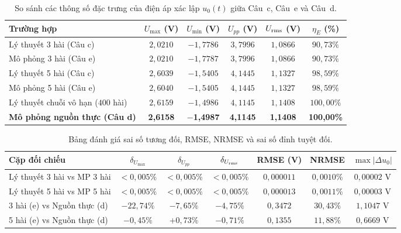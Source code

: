 \begin{table}[!htbp]
    \centering
    \caption{So sánh các thông số đặc trưng của điện áp xác lập $u_0(t)$ giữa Câu~c, Câu~e và Câu~d.}
    \label{tab:comparison_main}
    \vspace{4pt}
    \small
    \begin{tabular}{|l|c|c|c|c|c|}
        \toprule
        \textbf{Trường hợp} & \textbf{$U_{\max}$ (V)} & \textbf{$U_{\min}$ (V)} & \textbf{$U_{pp}$ (V)} & \textbf{$U_{\text{rms}}$ (V)} & \textbf{$\eta_E$ (\%)} \\
        \midrule
        Lý thuyết 3 hài (Câu c)       & $2{,}0210$ & $-1{,}7786$ & $3{,}7996$ & $1{,}0866$ & $90{,}73\%$ \\
        Mô phỏng 3 hài (Câu e)        & $2{,}0210$ & $-1{,}7787$ & $3{,}7996$ & $1{,}0866$ & $90{,}73\%$ \\
        \hline
        Lý thuyết 5 hài (Câu c)       & $2{,}6039$ & $-1{,}5405$ & $4{,}1445$ & $1{,}1327$ & $98{,}59\%$ \\
        Mô phỏng 5 hài (Câu e)        & $2{,}6040$ & $-1{,}5405$ & $4{,}1445$ & $1{,}1327$ & $98{,}59\%$ \\
        \hline
        Lý thuyết chuỗi vô hạn ($400$ hài) & $2{,}6159$ & $-1{,}4986$ & $4{,}1145$ & $1{,}1408$ & $100{,}00\%$ \\
        \textbf{Mô phỏng nguồn thực (Câu d)} & \textbf{2,6158} & \textbf{$-$1,4987} & \textbf{4,1145} & \textbf{1,1408} & \textbf{100,00\%} \\
        \bottomrule
    \end{tabular}
\end{table}

\begin{table}[!htbp]
    \centering
    \caption{Bảng đánh giá sai số tương đối, RMSE, NRMSE và sai số đỉnh tuyệt đối.}
    \label{tab:comparison_err}
    \vspace{4pt}
    \footnotesize
    \setlength{\tabcolsep}{3.2pt}
    \begin{tabular}{|l|c|c|c|c|c|c|}
        \toprule
        \textbf{Cặp đối chiếu} & \textbf{$\delta_{U_{\max}}$} & \textbf{$\delta_{U_{pp}}$} & \textbf{$\delta_{U_{\text{rms}}}$} & \textbf{RMSE (V)} & \textbf{NRMSE} & \textbf{$\max|\Delta u_0|$} \\
        \midrule
        Lý thuyết 3 hài vs MP 3 hài      & $<0{,}005\%$ & $<0{,}005\%$ & $<0{,}005\%$ & $0{,}000011$ & $0{,}0010\%$ & $0{,}00002\text{ V}$ \\
        Lý thuyết 5 hài vs MP 5 hài      & $<0{,}005\%$ & $<0{,}005\%$ & $<0{,}005\%$ & $0{,}000013$ & $0{,}0011\%$ & $0{,}00003\text{ V}$ \\
        \hline
        3 hài (e) vs Nguồn thực (d)      & $-22{,}74\%$ & $-7{,}65\%$  & $-4{,}75\%$  & $0{,}3472$   & $30{,}43\%$  & $1{,}1047\text{ V}$  \\
        5 hài (e) vs Nguồn thực (d)      & $-0{,}45\%$  & $+0{,}73\%$  & $-0{,}71\%$  & $0{,}1355$   & $11{,}88\%$  & $0{,}6669\text{ V}$  \\
        \bottomrule
    \end{tabular}
\end{table}

